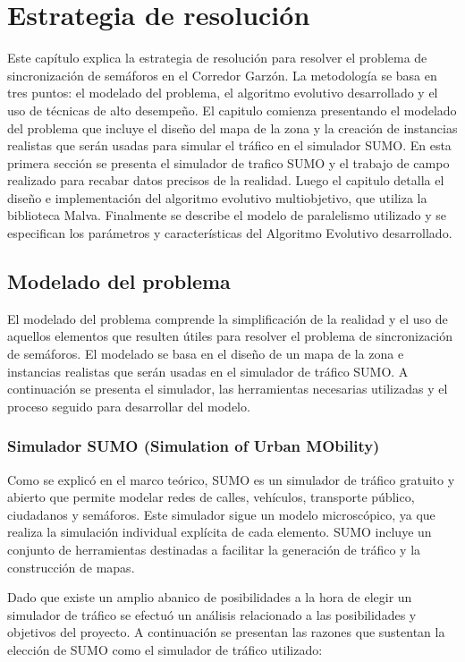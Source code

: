 \chapter{Estrategia de resolución}

Este capítulo explica la estrategia de resolución para resolver el problema de sincronización de semáforos en el Corredor Garzón. La metodología se basa en tres puntos: el modelado del problema, el algoritmo evolutivo desarrollado y el uso de técnicas de alto desempeño. El capitulo comienza presentando el modelado del problema que incluye el diseño del mapa de la zona y la creación de instancias realistas que serán usadas para simular el tráfico en el simulador SUMO. En esta primera sección se presenta el simulador de trafico SUMO y el trabajo de campo realizado para recabar datos precisos de la realidad. Luego el capitulo detalla el diseño e implementación del algoritmo evolutivo multiobjetivo, que utiliza la biblioteca Malva. Finalmente se describe el modelo de paralelismo utilizado y se especifican los parámetros y características del Algoritmo Evolutivo desarrollado.


\section{Modelado del problema }

El modelado del problema comprende la simplificación de la realidad y el uso de aquellos elementos que resulten útiles para resolver el problema de sincronización de semáforos. El modelado se basa en el diseño de un mapa de la zona e instancias realistas que serán usadas en el simulador de tráfico SUMO. A continuación se presenta el simulador, las herramientas necesarias utilizadas y el proceso seguido para desarrollar del modelo. 

\subsection{Simulador SUMO (Simulation of Urban MObility)}

Como se explicó en el marco teórico, SUMO es un simulador de tráfico gratuito y abierto que permite modelar redes de calles, vehículos, transporte público, ciudadanos y semáforos. Este simulador sigue un modelo microscópico, ya que realiza la simulación individual explícita de cada elemento. SUMO incluye un conjunto de herramientas destinadas a facilitar la generación de tráfico y la construcción de mapas. 

Dado que existe un amplio abanico de posibilidades a la hora de elegir un simulador de tráfico se efectuó un análisis relacionado a las posibilidades y objetivos del proyecto. A continuación se presentan las razones que sustentan la elección de SUMO como el simulador de tráfico utilizado:

